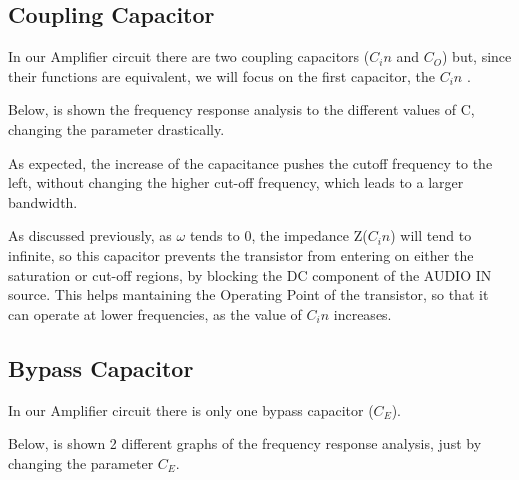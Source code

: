 \subsection{Coupling Capacitor}

In our Amplifier circuit there are two coupling capacitors ($C_in$ and $C_O$) but, since their functions are equivalent, we will focus on the first capacitor, the $C_in$ . \par 
Below, is shown the frequency response analysis to the different values of C, changing the parameter drastically.


As expected, the increase of the capacitance pushes the cutoff frequency to the left,
without changing the higher cut-off frequency, which leads to a larger bandwidth. \par
As discussed previously, as $\omega$ tends to 0, the impedance Z($C_in$) will tend to infinite, so this
capacitor prevents the transistor from entering on either the saturation or cut-off regions, by blocking the DC component of the AUDIO IN source. This helps mantaining the Operating Point of the transistor, so that it can operate at lower frequencies, as the value of $C_in$ increases.

\subsection{Bypass Capacitor}

In our Amplifier circuit there is only one bypass capacitor ($C_E$).\par 
Below, is shown 2 different graphs of the frequency response analysis, just by changing the parameter $C_E$.


